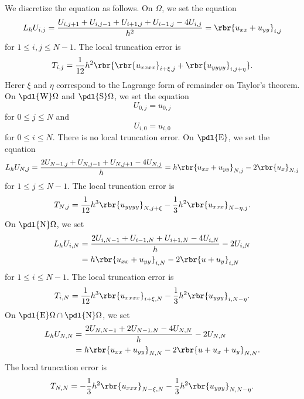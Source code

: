 \documentclass[english, nochinese]{pnote}
\begin{document}
We discretize the equation as follows. On $\Omega$, we set the equation
\begin{equation}
L_h U_{ i, j } = \frac{ U_{ i, j + 1 } + U_{ i, j - 1 } + U_{ i + 1, j } + U_{ i - 1, j } - 4 U_{ i, j } }{h^2} = \rbr{ u_{ x x } + u_{ y y } }_{ i, j }
\end{equation}
for $ 1 \le i, j \le N - 1 $. The local truncation error is
\begin{equation}
T_{ i, j } = \frac{1}{12} h^2 \rbr{ \rbr{u_{ x x x x }}_{ i + \xi, j } + \rbr{u_{ y y y y }}_{ i, j + \eta } }.
\end{equation}
Herer $\xi$ and $\eta$ correspond to the Lagrange form of remainder on Taylor's theorem.
On $ \pdl{\text{W}} \Omega $ and $ \pdl{\text{S}} \Omega $, we set the equation
\begin{equation}
U_{ 0, j } = u_{ 0, j }
\end{equation}
for $ 0 \le j \le N $ and
\begin{equation}
U_{ i, 0 } = u_{ i, 0 }
\end{equation}
for $ 0 \le i \le N $. There is no local truncation error. On $ \pdl{\text{E}}$, we set the equation
\begin{equation}
L_h U_{ N, j } = \frac{ 2 U_{ N - 1, j } + U_{ N, j - 1 } + U_{ N, j + 1 } - 4 U_{ N, j } }{h} = h \rbr{ u_{ x x } + u_{ y y } }_{ N, j } - 2 \rbr{u_x}_{ N, j }
\end{equation}
for $ 1 \le j \le N - 1 $.
The local truncation error is
\begin{equation}
T_{ N, j } = \frac{1}{12} h^3 \rbr{u_{ y y y y }}_{ N, j + \xi } - \frac{1}{3} h^2 \rbr{u_{ x x x }}_{ N - \eta, j }.
\end{equation}
On $ \pdl{\text{N}} \Omega $, we set
\begin{equation}
\begin{split}
L_h U_{ i, N } &= \frac{ 2 U_{ i, N - 1 } + U_{ i - 1, N } + U_{ i + 1, N } - 4 U_{ i, N } }{h} - 2 U_{ i, N } \\
&= h \rbr{ u_{ x x } + u_{ y y } }_{ i, N } - 2 \rbr{ u + u_y }_{ i, N }
\end{split}
\end{equation}
for $ 1 \le i \le N - 1 $.
The local truncation error is
\begin{equation}
T_{ i, N } = \frac{1}{12} h^3 \rbr{u_{ x x x x }}_{ i + \xi, N } - \frac{1}{3} h^2 \rbr{u_{ y y y }}_{ i, N - \eta }.
\end{equation}
On $ \pdl{\text{E}} \Omega \cap \pdl{\text{N}} \Omega $, we set
\begin{equation}
\begin{split}
L_h U_{ N, N } &= \frac{ 2 U_{ N, N - 1 } + 2 U_{ N - 1, N } - 4 U_{ N, N } }{h} - 2 U_{ N, N } \\
&= h \rbr{ u_{ x x } + u_{ y y } }_{ N, N } - 2 \rbr{ u + u_x + u_y }_{ N, N }.
\end{split}
\end{equation}
The local truncation error is
\begin{equation}
T_{ N, N } = - \frac{1}{3} h^2 \rbr{u_{ x x x }}_{ N - \xi, N } - \frac{1}{3} h^2 \rbr{u_{ y y y }}_{ N, N - \eta }.
\end{equation}
\end{document}
